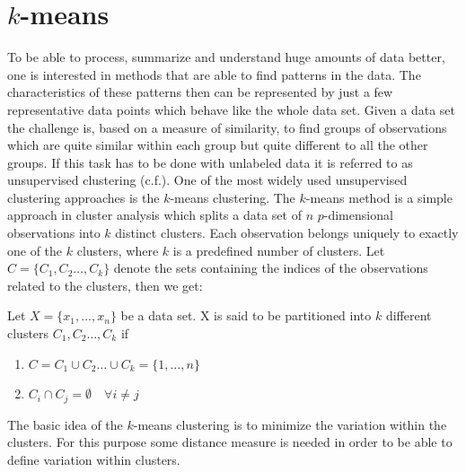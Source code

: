 

\chapter{$k$-means}
\label{cha:K-means}

To be able to process, summarize and understand huge amounts of data better, one is interested in methods that are able to find patterns in the data. The characteristics of these patterns then can be represented by just a few representative data points which behave like the whole data set. Given a  data set the challenge is, based on a measure of similarity, to find groups of observations which are quite similar within each group but quite different to all the other groups. If this task has to be done with unlabeled data it is referred to as unsupervised clustering (c.f.\cite{jain2010data}). One of the most widely used unsupervised clustering approaches is the $k$-means clustering. The $k$-means method is a simple approach in cluster analysis which splits a data set of $n$ $p$-dimensional observations into $k$ distinct clusters. Each observation belongs uniquely to exactly one of the $k$ clusters, where $k$ is a predefined number of clusters. Let $C=\{C_1, C_2 \dots, C_k\}$ denote the sets containing the indices of the observations  related to the clusters, then we get:
\begin{definition}
Let $X=\{x_1, ..., x_n\}$ be a data set. X is said to be partitioned into $k$ different clusters $C_1, C_2 \dots, C_k$ if
	\begin{enumerate}[label=(\roman*)] \centering
		\item $C = C_1 \cup C_2 \dots \cup C_k = \{1, \dots, n\}$

		\item $C_i \cap C_j = \emptyset \quad \forall i \neq j$
	\end{enumerate}
\end{definition}
The basic idea of the $k$-means clustering is to minimize the variation within the clusters. For this purpose some distance measure is needed in order to be able to define variation within clusters.
